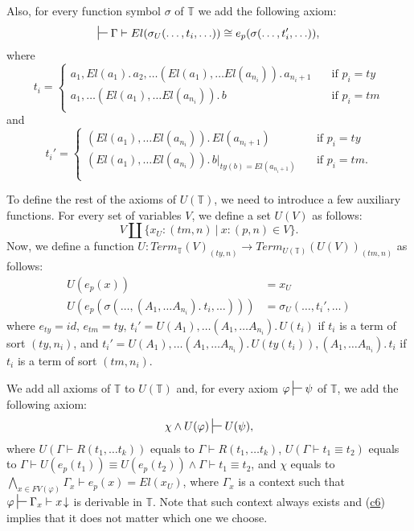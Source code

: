\documentclass[reqno]{amsart}
\newcommand{\axref}[1]{(\hyperref[ax:#1]{#1})}
\theoremstyle{definition}
\theoremstyle{remark}
\newcommand{\deq}{\equiv}
\numberwithin{figure}{section}
\begin{document}
\begin{example}
Also, for every function symbol $\sigma$ of $\mathbb{T}$ we add the following axiom:
\[ \sststile{}{} \Gamma \vdash El(\sigma_U(\ldots, t_i, \ldots)) \cong e_p(\sigma(\ldots, t_i', \ldots)), \]
where
\[ t_i =
  \begin{cases}
    a_1, El(a_1).\,a_2, \ldots (El(a_1), \ldots El(a_{n_i})).\,a_{n_i+1}    & \quad \text{if } p_i = ty \\
    a_1, \ldots (El(a_1), \ldots El(a_{n_i})).\,b                           & \quad \text{if } p_i = tm \\
  \end{cases}
\]
and
\[ t_i' =
  \begin{cases}
    (El(a_1), \ldots El(a_{n_i})).\,El(a_{n_i+1})               & \quad \text{if } p_i = ty \\
    (El(a_1), \ldots El(a_{n_i})).\,b|_{ty(b) = El(a_{n_i+1})}  & \quad \text{if } p_i = tm. \\
  \end{cases}
\]

To define the rest of the axioms of $U(\mathbb{T})$, we need to introduce a few auxiliary functions.
For every set of variables $V$, we define a set $U(V)$ as follows:
\[ V \amalg \{ x_U : (tm,n)\ |\ x : (p,n) \in V \}. \]
Now, we define a function $U : Term_\mathbb{T}(V)_{(ty,n)} \to Term_{U(\mathbb{T})}(U(V))_{(tm,n)}$ as follows:
\begin{align*}
U(e_p(x)) & = x_U \\
U(e_p(\sigma(\ldots, (A_1, \ldots A_{n_i}).\ t_i, \ldots))) & = \sigma_U(\ldots, t_i', \ldots)
\end{align*}
where $e_{ty} = id$, $e_{tm} = ty$, $t_i' = U(A_1), \ldots (A_1, \ldots A_{n_i}).\,U(t_i)$ if $t_i$ is a term of sort $(ty,n_i)$,
and $t_i' = U(A_1), \ldots (A_1, \ldots A_{n_i}).\,U(ty(t_i)), (A_1, \ldots A_{n_i}).\,t_i$ if $t_i$ is a term of sort $(tm,n_i)$.

We add all axioms of $\mathbb{T}$ to $U(\mathbb{T})$ and, for every axiom $\varphi \sststile{}{} \psi$ of $\mathbb{T}$, we add the following axiom:
\[ \chi \land U(\varphi) \sststile{}{} U(\psi), \]
where $U(\Gamma \vdash R(t_1, \ldots t_k))$ equals to $\Gamma \vdash R(t_1, \ldots t_k)$,
$U(\Gamma \vdash t_1 \deq t_2)$ equals to $\Gamma \vdash U(e_p(t_1)) \deq U(e_p(t_2)) \land \Gamma \vdash t_1 \deq t_2$,
and $\chi$ equals to $\bigwedge_{x \in FV(\varphi)} \Gamma_x \vdash e_p(x) = El(x_U)$, where $\Gamma_x$ is a context
such that $\varphi \sststile{}{} \Gamma_x \vdash x\!\downarrow$ is derivable in $\mathbb{T}$.
Note that such context always exists and \axref{c6} implies that it does not matter which one we choose.


\end{example}
\end{document}
